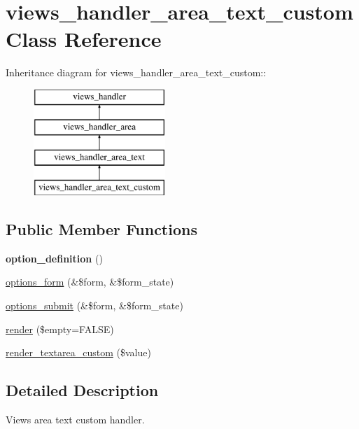 \hypertarget{classviews__handler__area__text__custom}{
\section{views\_\-handler\_\-area\_\-text\_\-custom Class Reference}
\label{classviews__handler__area__text__custom}
}
Inheritance diagram for views\_\-handler\_\-area\_\-text\_\-custom::\begin{figure}[H]
\begin{center}
\leavevmode
\includegraphics[height=4cm]{classviews__handler__area__text__custom}
\end{center}
\end{figure}
\subsection*{Public Member Functions}
\begin{DoxyCompactItemize}
\item 
\hypertarget{classviews__handler__area__text__custom_acebb058272ce53ba0f5d87b5b0ac087c}{
{\bfseries option\_\-definition} ()}
\label{classviews__handler__area__text__custom_acebb058272ce53ba0f5d87b5b0ac087c}

\item 
\hyperlink{classviews__handler__area__text__custom_a93eb91b0ea21ca78b68b5a4832cc9035}{options\_\-form} (\&\$form, \&\$form\_\-state)
\item 
\hyperlink{classviews__handler__area__text__custom_a76f34efb470e6c03f7c67e655405e250}{options\_\-submit} (\&\$form, \&\$form\_\-state)
\item 
\hyperlink{classviews__handler__area__text__custom_a04acaaef479eb115b7912b963967387c}{render} (\$empty=FALSE)
\item 
\hyperlink{classviews__handler__area__text__custom_a02f20635fa1e858df9bb64768efb1f00}{render\_\-textarea\_\-custom} (\$value)
\end{DoxyCompactItemize}


\subsection{Detailed Description}
Views area text custom handler. 

